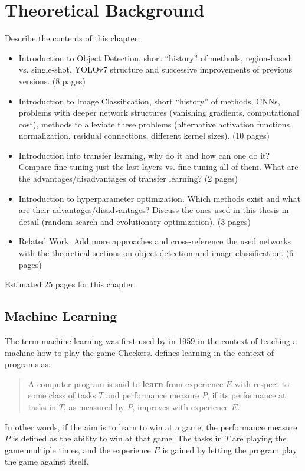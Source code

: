 \documentclass[draft,final]{vutinfth} %
\begin{document}
\chapter{Theoretical Background}
\label{chap:background}

Describe the contents of this chapter.

\begin{itemize}
\item Introduction to Object Detection, short ``history'' of methods,
  region-based vs. single-shot, YOLOv7 structure and successive
  improvements of previous versions. (8 pages)
\item Introduction to Image Classification, short ``history'' of
  methods, CNNs, problems with deeper network structures (vanishing
  gradients, computational cost), methods to alleviate these problems
  (alternative activation functions, normalization, residual
  connections, different kernel sizes). (10 pages)
\item Introduction into transfer learning, why do it and how can one
  do it? Compare fine-tuning just the last layers vs. fine-tuning all
  of them. What are the advantages/disadvantages of transfer learning?
  (2 pages)
\item Introduction to hyperparameter optimization. Which methods exist
  and what are their advantages/disadvantages? Discuss the ones used
  in this thesis in detail (random search and evolutionary
  optimization). (3 pages)
\item Related Work. Add more approaches and cross-reference the used
  networks with the theoretical sections on object detection and image
  classification. (6 pages)
\end{itemize}

Estimated 25 pages for this chapter.

\section{Machine Learning}
\label{sec:theory-ml}

The term machine learning was first used by \textcite{samuel2000} in
1959 in the context of teaching a machine how to play the game
Checkers. \textcite{mitchell1997a} defines learning in the context of
programs as:
\begin{quote}
  A computer program is said to \textbf{learn} from experience $E$
  with respect to some class of tasks $T$ and performance measure $P$,
  if its performance at tasks in $T$, as measured by $P$, improves
  with experience $E$. \cite[p.2]{mitchell1997a}
\end{quote}
In other words, if the aim is to learn to win at a game, the
performance measure $P$ is defined as the ability to win at that
game. The tasks in $T$ are playing the game multiple times, and the
experience $E$ is gained by letting the program play the game against
itself.
\end{document}
